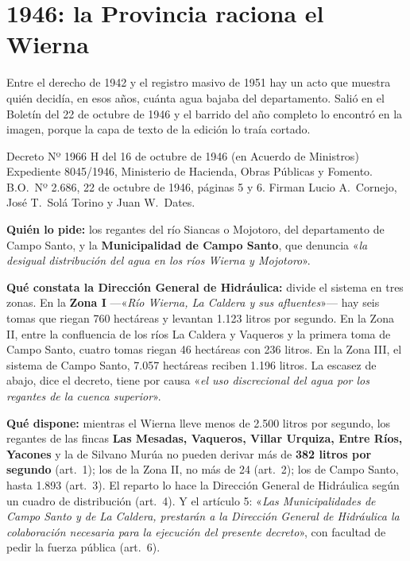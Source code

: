 \section{1946: la Provincia raciona el Wierna}

Entre el derecho de 1942 y el registro masivo de 1951 hay un acto que muestra quién decidía, en
esos años, cuánta agua bajaba del departamento. Salió en el Boletín del 22 de octubre de 1946
y el barrido del año completo lo encontró en la imagen, porque la capa de texto de la edición
lo traía cortado.

\begin{ficha}{Decreto Nº 1966 H del 16 de octubre de 1946 (en Acuerdo de Ministros)}
Expediente 8045/1946, Ministerio de Hacienda, Obras Públicas y Fomento. B.O.\ Nº 2.686, 22 de
octubre de 1946, páginas 5 y 6. Firman Lucio A.\ Cornejo, José T.\ Solá Torino y Juan W.\ Dates.

\textbf{Quién lo pide:} los regantes del río Siancas o Mojotoro, del departamento de Campo
Santo, y la \textbf{Municipalidad de Campo Santo}, que denuncia «\textit{la desigual distribución
del agua en los ríos Wierna y Mojotoro}».

\textbf{Qué constata la Dirección General de Hidráulica:} divide el sistema en tres zonas. En la
\textbf{Zona I} ---«\textit{Río Wierna, La Caldera y sus afluentes}»--- hay seis tomas que riegan
760 hectáreas y levantan 1.123 litros por segundo. En la Zona II, entre la confluencia de los
ríos La Caldera y Vaqueros y la primera toma de Campo Santo, cuatro tomas riegan 46 hectáreas
con 236 litros. En la Zona III, el sistema de Campo Santo, 7.057 hectáreas reciben 1.196 litros.
La escasez de abajo, dice el decreto, tiene por causa «\textit{el uso discrecional del agua por
los regantes de la cuenca superior}».

\textbf{Qué dispone:} mientras el Wierna lleve menos de 2.500 litros por segundo, los regantes de
las fincas \textbf{Las Mesadas, Vaqueros, Villar Urquiza, Entre Ríos, Yacones} y la de Silvano
Murúa no pueden derivar más de \textbf{382 litros por segundo} (art.\ 1); los de la Zona II, no
más de 24 (art.\ 2); los de Campo Santo, hasta 1.893 (art.\ 3). El reparto lo hace la Dirección
General de Hidráulica según un cuadro de distribución (art.\ 4). Y el artículo 5: «\textit{Las
Municipalidades de Campo Santo y de La Caldera, prestarán a la Dirección General de Hidráulica
la colaboración necesaria para la ejecución del presente decreto}», con facultad de pedir la
fuerza pública (art.\ 6).
\end{ficha}

